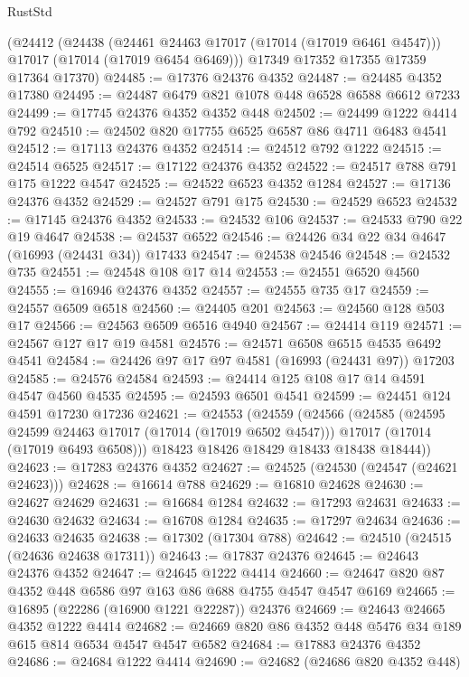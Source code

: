 \begin{lexlean}{RustStd}
\begin{coremodule}
    (@24412
      (@24438
        (@24461 @24463 @17017 (@17014 (@17019 @6461 @4547)))
        @17017
        (@17014 (@17019 @6454 @6469)))
      @17349
      @17352
      @17355
      @17359
      @17364
      @17370)
@24485 := @17376 @24376 @4352
@24487 := @24485 @4352 @17380
@24495 := @24487 @6479 @821 @1078 @448 @6528 @6588 @6612 @7233
@24499 := @17745 @24376 @4352 @4352 @448
@24502 := @24499 @1222 @4414 @792
@24510 := @24502 @820 @17755 @6525 @6587 @86 @4711 @6483 @4541
@24512 := @17113 @24376 @4352
@24514 := @24512 @792 @1222
@24515 := @24514 @6525
@24517 := @17122 @24376 @4352
@24522 := @24517 @788 @791 @175 @1222 @4547
@24525 := @24522 @6523 @4352 @1284
@24527 := @17136 @24376 @4352
@24529 := @24527 @791 @175
@24530 := @24529 @6523
@24532 := @17145 @24376 @4352
@24533 := @24532 @106
@24537 := @24533 @790 @22 @19 @4647
@24538 := @24537 @6522
@24546 := @24426 @34 @22 @34 @4647 (@16993 (@24431 @34)) @17433
@24547 := @24538 @24546
@24548 := @24532 @735
@24551 := @24548 @108 @17 @14
@24553 := @24551 @6520 @4560
@24555 := @16946 @24376 @4352
@24557 := @24555 @735 @17
@24559 := @24557 @6509 @6518
@24560 := @24405 @201
@24563 := @24560 @128 @503 @17
@24566 := @24563 @6509 @6516 @4940
@24567 := @24414 @119
@24571 := @24567 @127 @17 @19 @4581
@24576 := @24571 @6508 @6515 @4535 @6492 @4541
@24584 := @24426 @97 @17 @97 @4581 (@16993 (@24431 @97)) @17203
@24585 := @24576 @24584
@24593 := @24414 @125 @108 @17 @14 @4591 @4547 @4560 @4535
@24595 := @24593 @6501 @4541
@24599 := @24451 @124 @4591 @17230 @17236
@24621 := @24553
    (@24559
      (@24566
        (@24585
          (@24595 @24599 @24463 @17017 (@17014 (@17019 @6502 @4547)))
          @17017
          (@17014 (@17019 @6493 @6508)))
        @18423
        @18426
        @18429
        @18433
        @18438
        @18444))
@24623 := @17283 @24376 @4352
@24627 := @24525 (@24530 (@24547 (@24621 @24623)))
@24628 := @16614 @788
@24629 := @16810 @24628
@24630 := @24627 @24629
@24631 := @16684 @1284
@24632 := @17293 @24631
@24633 := @24630 @24632
@24634 := @16708 @1284
@24635 := @17297 @24634
@24636 := @24633 @24635
@24638 := @17302 (@17304 @788)
@24642 := @24510 (@24515 (@24636 @24638 @17311))
@24643 := @17837 @24376
@24645 := @24643 @24376 @4352
@24647 := @24645 @1222 @4414
@24660 := @24647 @820 @87 @4352 @448 @6586 @97 @163 @86 @688 @4755 @4547 @4547 @6169
@24665 := @16895 (@22286 (@16900 @1221 @22287)) @24376
@24669 := @24643 @24665 @4352 @1222 @4414
@24682 := @24669 @820 @86 @4352 @448 @5476 @34 @189 @615 @814 @6534 @4547 @4547 @6582
@24684 := @17883 @24376 @4352
@24686 := @24684 @1222 @4414
@24690 := @24682 (@24686 @820 @4352 @448)

\end{coremodule}
\end{lexlean}
